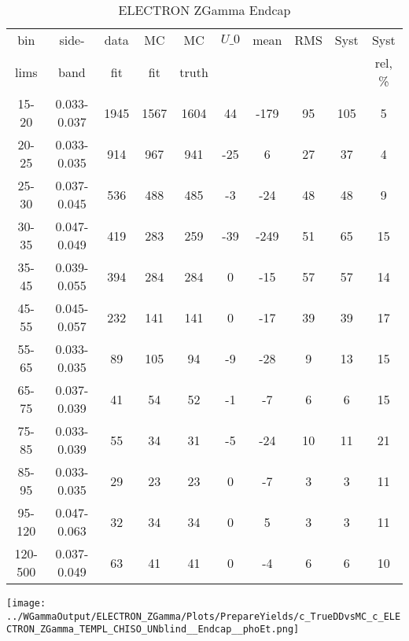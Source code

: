 \documentclass{beamer}
\begin{document}
\begin{frame}
{
\begin{table}[h]
  	\tiny
  \begin{center}
  \caption{ELECTRON ZGamma Endcap}
  \begin{tabular}{|c|c|c|c|c|c|c|c|c|c|}
    bin & side- & data & MC & MC    & $U\_{0}$ & mean & RMS & Syst & Syst \\ 
    lims & band & fit & fit & truth &       &      &     &      & rel, \% \\ \hline
    15-20 & 0.033-0.037 & 1945 & 1567 & 1604 & 44 & -179 & 95 & 105 & 5  \\ \hline
    20-25 & 0.033-0.035 & 914 & 967 & 941 & -25 & 6 & 27 & 37 & 4  \\ \hline
    25-30 & 0.037-0.045 & 536 & 488 & 485 & -3 & -24 & 48 & 48 & 9  \\ \hline
    30-35 & 0.047-0.049 & 419 & 283 & 259 & -39 & -249 & 51 & 65 & 15  \\ \hline
    35-45 & 0.039-0.055 & 394 & 284 & 284 & 0 & -15 & 57 & 57 & 14  \\ \hline
    45-55 & 0.045-0.057 & 232 & 141 & 141 & 0 & -17 & 39 & 39 & 17  \\ \hline
    55-65 & 0.033-0.035 & 89 & 105 & 94 & -9 & -28 & 9 & 13 & 15  \\ \hline
    65-75 & 0.037-0.039 & 41 & 54 & 52 & -1 & -7 & 6 & 6 & 15  \\ \hline
    75-85 & 0.033-0.039 & 55 & 34 & 31 & -5 & -24 & 10 & 11 & 21  \\ \hline
    85-95 & 0.033-0.035 & 29 & 23 & 23 & 0 & -7 & 3 & 3 & 11  \\ \hline
    95-120 & 0.047-0.063 & 32 & 34 & 34 & 0 & 5 & 3 & 3 & 11  \\ \hline
    120-500 & 0.037-0.049 & 63 & 41 & 41 & 0 & -4 & 6 & 6 & 10  \\ \hline
  \end{tabular}
  \label{tab:systSbVar_Meth1_ELECTRON_ZGamma_Endcap}
  \end{center}
\end{table}

\texttt{[image: ../WGammaOutput/ELECTRON\_ZGamma/Plots/PrepareYields/c\_TrueDDvsMC\_c\_ELECTRON\_ZGamma\_TEMPL\_CHISO\_UNblind\_\_Endcap\_\_phoEt.png]} 

}
\end{frame}
\end{document}
